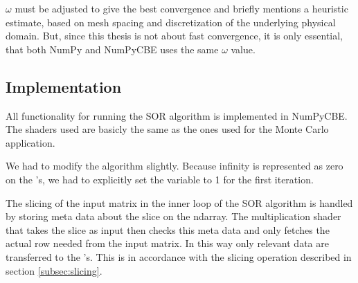 $\omega$ must be adjusted to give the best convergence and
\cite{mathworld-sor} briefly mentions a heuristic estimate, based on mesh spacing and discretization of the underlying physical domain. But, since this thesis is not about fast convergence, it is only essential, that both NumPy and NumPyCBE uses the same $\omega$ value.

\subsection{Implementation}

All functionality for running the SOR algorithm is implemented in NumPyCBE.
The shaders used are basicly the same as the ones used for the Monte Carlo application.

We had to modify the algorithm slightly. Because infinity is
represented as zero on the \SPE{}'s, we had to explicitly set the
variable  to 1 for the first iteration.

The slicing of the input matrix in the inner loop of the SOR algorithm
is handled by storing meta data about the slice on the ndarray. The
multiplication shader that takes the slice as input then checks this
meta data and only fetches the actual row needed from the input matrix.
In this way only relevant data are transferred to the \SPE{}'s. This
is in accordance with the slicing operation described in
section \ref{subsec:slicing}.

